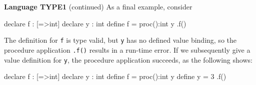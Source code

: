 \begin{minipage}[t]{\sw}
\slidenumber
\LARGE
{\bf Language TYPE1} (continued)\exx
As a final example, consider
\Large
\begin{qv}
declare f : [=>int]
declare y : int
define f = proc():int y
.f() %
\end{qv}
\LARGE
The definition for \verb'f' is type valid,
but \verb'y' has no defined value binding,
so the procedure application \verb'.f()'
results in a run-time error.\exx
If we subsequently give a value definition for \verb'y',
the procedure application succeeds,
as the following shows:
\Large
\begin{qv}
declare f : [=>int]
declare y : int
define f = proc():int y
define y = 3
.f() %
\end{qv}
\end{minipage}
